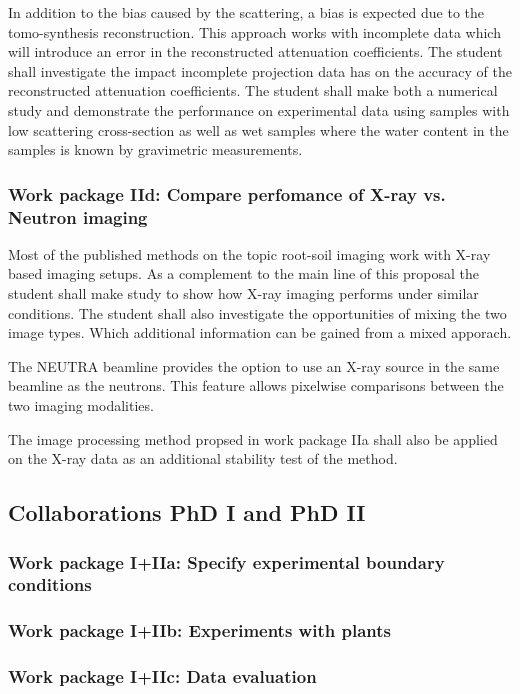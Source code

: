 \documentclass[a4paper,11pt]{scrreprt}
\begin{document}
In addition to the bias caused by the scattering, a bias is expected due to the tomo-synthesis 
reconstruction. This approach works with incomplete data which will introduce an error in the 
reconstructed attenuation coefficients. The student shall investigate the 
impact incomplete projection data has on the accuracy of the reconstructed 
attenuation coefficients. The student shall make both a numerical study and 
demonstrate the performance on experimental data using samples with low scattering cross-section 
as well as wet samples where the water content in the samples is known by gravimetric measurements. 

\subsubsection{Work package IId: Compare perfomance of X-ray vs. Neutron imaging}
Most of the published methods on the topic root-soil imaging work with X-ray based imaging setups. 
As a complement to the main line of this proposal the student shall make study to show how X-ray 
imaging performs under similar conditions. The student shall also investigate the opportunities 
of mixing the two image types. Which additional information can be gained from a mixed apporach. 

The NEUTRA beamline provides the option to use an X-ray source in the same beamline as 
the neutrons. This feature allows pixelwise comparisons between the two imaging modalities. 

The image processing method propsed in work package IIa shall also be applied on the 
X-ray data as an additional stability test of the method.


\subsection{Collaborations PhD I and PhD II}
\subsubsection{Work package I+IIa: Specify experimental boundary conditions}
\subsubsection{Work package I+IIb: Experiments with plants}
\subsubsection{Work package I+IIc: Data evaluation}
\end{document}
